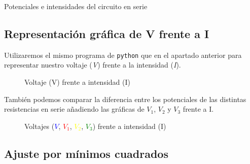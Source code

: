 \documentclass[12pt, a4paper, titlepage]{article}
\newcommand{\code}[1]{\texttt{#1}} %
\begin{document}
  \begin{table}[H]
  \centering
  \caption{Potenciales e intensidades del circuito en serie}
  \end{table}

  \subsection{Representación gráfica de V frente a I}

  Utilizaremos el mismo programa de \code{python} que en el apartado anterior para representar nuestro voltaje (\textit{V}) frente a la intensidad (\textit{I}).

  \begin{figure}[H]
    \hspace{2.5em} 
    \caption{Voltaje (V) frente a intensidad (I)}
  \end{figure}

  También podemos comparar la diferencia entre los potenciales de las distintas resistencias en serie añadiendo las gráficas de $V_1$, $V_2$ y $V_3$ frente a I.

  \begin{figure}[H]
    \hspace{2.5em} 
    \caption{Voltajes (\textcolor{Blue}{$V$}, \textcolor{Red}{$V_1$}, \textcolor{Yellow}{$V_2$}, \textcolor{Green}{$V_3$}) frente a intensidad (I)}
  \end{figure}

  \subsection{Ajuste por mínimos cuadrados}
  \label{sec:ajusteminimoscuadradosserie}
\end{document}
